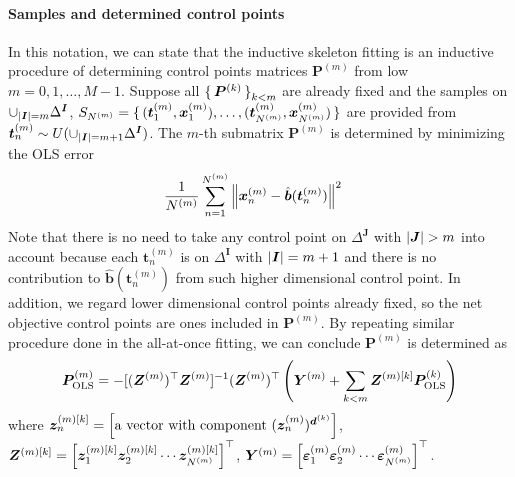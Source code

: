 \documentclass{article}
\begin{document}
\paragraph{Samples and determined control points}
In this notation, we can state that the inductive skeleton fitting is an inductive procedure of determining control points matrices $\bm P^{(m)}$ from low $m=0, 1, \dots, M-1$.
%
Suppose all $\set{\bm P^{(k)}}_{k < m}$ are already fixed and the samples on $\cup_{\left| \bm I \right| = m} \Delta^{\bm I}$,
$S_{N^{(m)}} = \set{(\bm t_1^{(m)}, \bm x_1^{(m)}), \dots, (\bm t_{N^{(m)}}^{(m)}, \bm x_{N^{(m)}}^{(m)})}$ are provided from
${\bm t}_n^{(m)} \sim U(\cup_{\left| \bm I \right| = m+1} \Delta^{\bm I})$.
The $m$-th submatrix $\bm P^{(m)}$ is determined by minimizing the OLS error
\begin{align}
&
\frac{1}{N^{(m)}}
\sum_{n = 1}^{N^{(m)}}
\left\| 
\bm x_n^{(m)}
-
\hat{\bm b}(\bm t_n^{(m)})
 \right\|^2\label{eqn:OLS}
\end{align}
Note that there is no need to take any control point on $\Delta^{\bm J}$ with $\left| \bm J \right| > m$ into account because each $\bm t_n^{(m)}$ is on $\Delta^{\bm I}$ with $\left| \bm I \right| = m+1$ and there is no contribution to $\hat{\bm b}(\bm t_n^{(m)})$ from such higher dimensional control point.
In addition, we regard lower dimensional control points already fixed, so the net objective control points are ones included in $\bm P^{(m)}$.
By repeating similar procedure done in the all-at-once fitting, we can conclude $\bm P^{(m)}$ is determined as
\begin{align}
{\bm P}_\mathrm{OLS}^{(m)}
= %
-
[({\bm Z}^{(m)})^\top {\bm Z}^{(m)}]^{-1}
({\bm Z}^{(m)})^\top 
\paren{
{\bm Y}^{(m)}
+
\sum_{k < m}
{\bm Z}^{(m) [k]}
{\bm P}_\mathrm{OLS}^{(k)}
}
\label{eqn:P_OLS}
\end{align}
where
$
{\bm z}_{n}^{(m)[k]}
=
\left[\text{a vector with component }
({\bm z}_{n}^{(m)})^{{\bm d}^{(k)}}
 \right]$,
$
{\bm Z}^{(m) [k]}
=
\left[{\bm z}_1^{(m) [k]}
 \bm{z}_2^{(m) [k]}
 \cdots 
 {\bm z}_{N^{(m)}}^{(m) [k]} \right]^\top$,
$
{\bm Y}^{(m)}
=
\left[{\bm \varepsilon}_1^{(m)} \bm{\varepsilon}_2^{(m)} \cdots {\bm \varepsilon}_{N^{(m)}}^{(m)} \right]^\top
.
$
\end{document}
